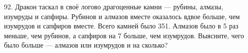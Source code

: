 92. Дракон таскал в своё логово драгоценные камни --- рубины, алмазы, изумруды и сапфиры. Рубинов и алмазов вместе оказалось вдвое больше, чем изумрудов и сапфиров вместе. Всего камней было 351. Алмазов было в 5 раз меньше, чем рубинов, а сапфиров на 7 больше, чем изумрудов. Выясните, чего было больше --- алмазов или изумрудов и на сколько?\\
